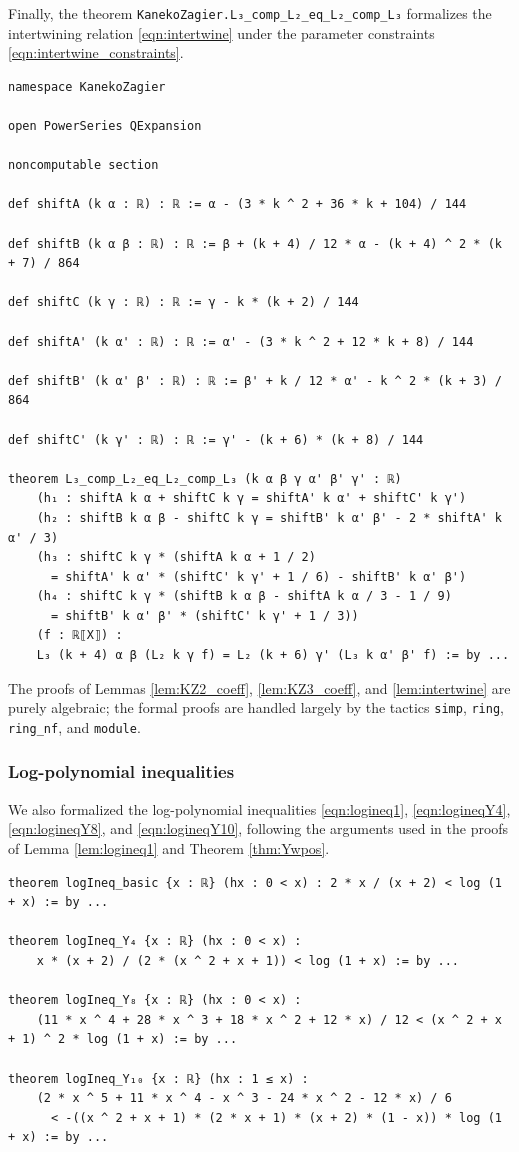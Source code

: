 \documentclass[10pt,reqno]{amsproc}
\newcommand{\1}{\mathds{1}}	%
\theoremstyle{definition}
\theoremstyle{remark}
\begin{document}
Finally, the theorem \lstinline|KanekoZagier.L₃_comp_L₂_eq_L₂_comp_L₃| formalizes the intertwining relation \eqref{eqn:intertwine} under the parameter constraints \eqref{eqn:intertwine_constraints}.

\begin{lstlisting}[language=lean]
namespace KanekoZagier

open PowerSeries QExpansion

noncomputable section

def shiftA (k α : ℝ) : ℝ := α - (3 * k ^ 2 + 36 * k + 104) / 144

def shiftB (k α β : ℝ) : ℝ := β + (k + 4) / 12 * α - (k + 4) ^ 2 * (k + 7) / 864

def shiftC (k γ : ℝ) : ℝ := γ - k * (k + 2) / 144

def shiftA' (k α' : ℝ) : ℝ := α' - (3 * k ^ 2 + 12 * k + 8) / 144

def shiftB' (k α' β' : ℝ) : ℝ := β' + k / 12 * α' - k ^ 2 * (k + 3) / 864

def shiftC' (k γ' : ℝ) : ℝ := γ' - (k + 6) * (k + 8) / 144

theorem L₃_comp_L₂_eq_L₂_comp_L₃ (k α β γ α' β' γ' : ℝ)
    (h₁ : shiftA k α + shiftC k γ = shiftA' k α' + shiftC' k γ')
    (h₂ : shiftB k α β - shiftC k γ = shiftB' k α' β' - 2 * shiftA' k α' / 3)
    (h₃ : shiftC k γ * (shiftA k α + 1 / 2)
      = shiftA' k α' * (shiftC' k γ' + 1 / 6) - shiftB' k α' β')
    (h₄ : shiftC k γ * (shiftB k α β - shiftA k α / 3 - 1 / 9)
      = shiftB' k α' β' * (shiftC' k γ' + 1 / 3))
    (f : ℝ⟦X⟧) :
    L₃ (k + 4) α β (L₂ k γ f) = L₂ (k + 6) γ' (L₃ k α' β' f) := by ...
\end{lstlisting}

The proofs of Lemmas \ref{lem:KZ2_coeff}, \ref{lem:KZ3_coeff}, and \ref{lem:intertwine} are purely algebraic; the formal proofs are handled largely by the tactics \lstinline|simp|, \lstinline|ring|, \lstinline|ring_nf|, and \lstinline|module|.


\subsubsection{Log-polynomial inequalities}

We also formalized the log-polynomial inequalities \eqref{eqn:logineq1}, \eqref{eqn:logineqY4}, \eqref{eqn:logineqY8}, and \eqref{eqn:logineqY10}, following the arguments used in the proofs of Lemma \ref{lem:logineq1} and Theorem \ref{thm:Ywpos}.

\begin{lstlisting}[language=lean]
theorem logIneq_basic {x : ℝ} (hx : 0 < x) : 2 * x / (x + 2) < log (1 + x) := by ...

theorem logIneq_Y₄ {x : ℝ} (hx : 0 < x) :
    x * (x + 2) / (2 * (x ^ 2 + x + 1)) < log (1 + x) := by ...

theorem logIneq_Y₈ {x : ℝ} (hx : 0 < x) :
    (11 * x ^ 4 + 28 * x ^ 3 + 18 * x ^ 2 + 12 * x) / 12 < (x ^ 2 + x + 1) ^ 2 * log (1 + x) := by ...

theorem logIneq_Y₁₀ {x : ℝ} (hx : 1 ≤ x) :
    (2 * x ^ 5 + 11 * x ^ 4 - x ^ 3 - 24 * x ^ 2 - 12 * x) / 6
      < -((x ^ 2 + x + 1) * (2 * x + 1) * (x + 2) * (1 - x)) * log (1 + x) := by ...
\end{lstlisting}
\end{document}
